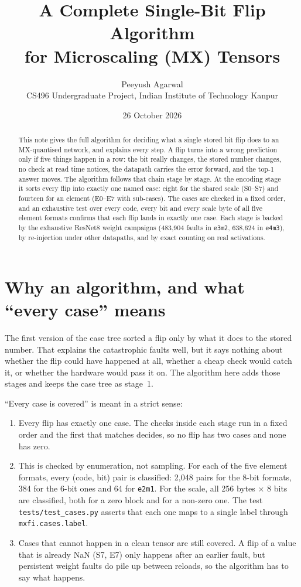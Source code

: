 \documentclass[10pt,a4paper]{article}
\title{\textbf{A Complete Single-Bit Flip Algorithm\\for Microscaling (MX) Tensors}}
\author{Peeyush Agarwal\\[2pt]
\small CS496 Undergraduate Project, Indian Institute of Technology Kanpur}
\date{26 October 2026}
\newcommand{\fmt}[1]{\texttt{#1}}
\begin{document}
\maketitle

\begin{abstract}
\noindent This note gives the full algorithm for deciding what a single stored bit flip does to
an MX-quantised network, and explains every step. A flip turns into a wrong prediction only if
five things happen in a row: the bit really changes, the stored number changes, no check at
read time notices, the datapath carries the error forward, and the top-1 answer moves. The
algorithm follows that chain stage by stage. At the encoding stage it sorts every flip into
exactly one named case: eight for the shared scale (S0--S7) and fourteen for an element
(E0--E7 with sub-cases). The cases are checked in a fixed order, and an exhaustive test over
every code, every bit and every scale byte of all five element formats confirms that each flip
lands in exactly one case. Each stage is backed by the exhaustive ResNet8 weight campaigns
(483,904 faults in \fmt{e3m2}, 638,624 in \fmt{e4m3}), by re-injection under other datapaths,
and by exact counting on real activations.
\end{abstract}

\tableofcontents

\section{Why an algorithm, and what ``every case'' means}

The first version of the case tree sorted a flip only by what it does to the stored number. That
explains the catastrophic faults well, but it says nothing about whether the flip could have
happened at all, whether a cheap check would catch it, or whether the hardware would pass it on.
The algorithm here adds those stages and keeps the case tree as stage~1.

``Every case is covered'' is meant in a strict sense:
\begin{enumerate}
  \item Every flip has exactly one case. The checks inside each stage run in a fixed order and
        the first that matches decides, so no flip has two cases and none has zero.
  \item This is checked by enumeration, not sampling. For each of the five element formats,
        every (code, bit) pair is classified: 2,048 pairs for the 8-bit formats, 384 for the 6-bit
        ones and 64 for \fmt{e2m1}. For the scale, all 256 bytes $\times$ 8 bits are classified,
        both for a zero block and for a non-zero one. The test
        \texttt{tests/test\_cases.py} asserts that each one maps to a single label through
        \texttt{mxfi.cases.label}.
  \item Cases that cannot happen in a clean tensor are still covered. A flip of a value that is
        already NaN (S7, E7) only happens after an earlier fault, but persistent weight faults do
        pile up between reloads, so the algorithm has to say what happens.
\end{enumerate}
\end{document}
